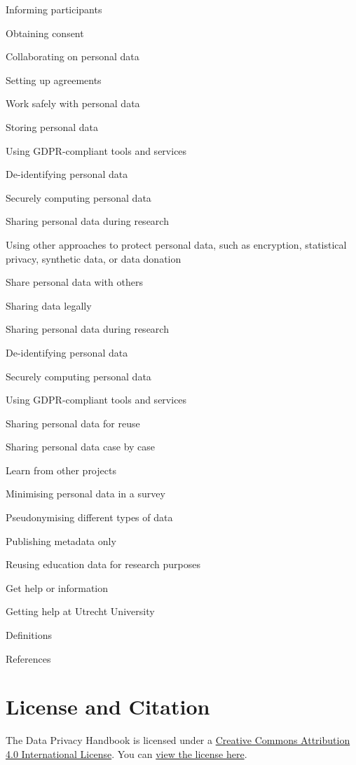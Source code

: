 \documentclass[
]{book}
\begin{document}
Informing participants

Obtaining consent

Collaborating on personal data

Setting up agreements

Work safely with personal data

Storing personal data

Using GDPR-compliant tools and services

De-identifying personal data

Securely computing personal data

Sharing personal data during research

Using other approaches to protect personal data, such as
encryption,
statistical privacy,
synthetic data, or
data donation

Share personal data with others

Sharing data legally

Sharing personal data during research

De-identifying personal data

Securely computing personal data

Using GDPR-compliant tools and services

Sharing personal data for reuse

Sharing personal data case by case

Learn from other projects

Minimising personal data in a survey

Pseudonymising different types of data

Publishing metadata only

Reusing education data for research purposes

Get help or information

Getting help at Utrecht University

Definitions

References

\hypertarget{license-and-citation}{%
\section{License and Citation}\label{license-and-citation}}

The Data Privacy Handbook is licensed under a
\href{https://creativecommons.org/licenses/by/4.0/}{Creative Commons Attribution 4.0 International License}.
You can \href{https://github.com/UtrechtUniversity/dataprivacyhandbook/blob/main/LICENSE.md}{view the license here}.
\end{document}
